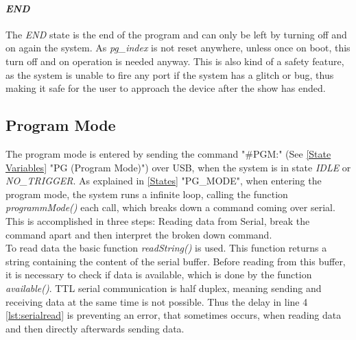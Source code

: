 

\paragraph{\textit{END}}
The \textit{END} state is the end of the program and can only be left by turning off and on again the system. As \textit{pg\_index} is not reset anywhere, unless once on boot, this turn off and on operation is needed anyway.  This is also kind of a safety feature, as the system is unable to fire any port if the system has a glitch or bug, thus making it safe for the user to approach the device after the show has ended. \\

\pagebreak


\subsection{Program Mode}
\label{Program Mode}

The program mode is entered by sending the command "\#PGM:" (See \cref{State Variables} "PG (Program Mode)") over USB, when the system is in state \textit{IDLE} or \textit{NO\_TRIGGER}. As explained in \cref{States} "PG\_MODE",  when entering the program mode, the system runs a infinite loop, calling the function \textit{programmMode()} each call, which breaks down a command coming over serial. This is accomplished in three steps: Reading data from Serial, break the command apart and then interpret the broken down command.\\



\noindent To read data the basic function \textit{readString()} is used. This function returns a string containing the content of the serial buffer. Before reading from this buffer, it is necessary to check if data is available, which is done by the function \textit{available()}. TTL serial communication is half duplex, meaning sending and receiving data at the same time is not possible. Thus the delay in line 4  \cref{lst:serialread} is preventing an error, that sometimes occurs, when reading data and then directly afterwards sending data.\\

